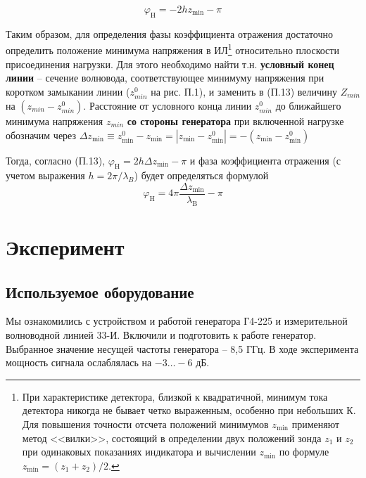 \begin{equation}
	\varphi _ { \mathrm { H } } = - 2 h z _ { \mathrm { min } } - \pi
\end{equation}

Таким образом, для определения фазы коэффициента отражения достаточно определить положение минимума напряжения в ИЛ\footnote{При характеристике детектора, близкой к квадратичной, минимум тока детектора никогда не бывает четко выраженным, особенно при небольших К. Для повышения точности отсчета положений минимумов $z_{\min}$ применяют метод <<вилки>>, состоящий в определении двух положений зонда $z_1$ и $z_2$ при одинаковых показаниях индикатора и вычислении $z_{\min}$ по формуле $z_{\min}=(z_1+z_2)/2$.} относительно плоскости присоединения нагрузки. 
%
Для этого необходимо найти т.н. \textbf{условный конец линии} -- сечение волновода, соответствующее минимуму напряжения при коротком замыкании линии ($z^0_{min}$ на рис. П.1), и заменить в (П.13) величину $Z_{min}$ на $(z_{min}-z_{min}^0)$. 
Расстояние от условного конца линии $z^0_{min}$ до ближайшего минимума напряжения $z_{min}$ \textbf{со стороны генератора} при включенной нагрузке обозначим через 
$\Delta z _ { \min } \equiv z _ { \min } ^ { 0 } - z _ { \min } = \left| z _ { \min } - z _ { \min } ^ { 0 } \right| =- \left( z _ { \min } - z _ { \min } ^ { 0 } \right)$

Тогда, согласно (П.13),  $\varphi _ { \mathrm { H } } = 2 h \Delta z _ { \mathrm { min } } - \pi$ и фаза коэффициента отражения (с учетом выражения $h=2\pi/\lambda_B$) будет определяться формулой
\begin{equation}
	\varphi _ { \mathrm { H } } = 4 \pi \frac { \Delta z _ { \mathrm { min } } } { \lambda _ { \mathrm { B } } } - \pi
\end{equation}

\section{Эксперимент}

\subsection{Используемое оборудование}

Мы ознакомились с устройством и работой генератора Г4-225 и измерительной волноводной линией 33-И. Включили и подготовить к работе генератор. Выбранное значение несущей частоты генератора -- 8,5 ГГц. В ходе эксперимента мощность сигнала ослаблялась на $-3\ldots-6$ дБ.

